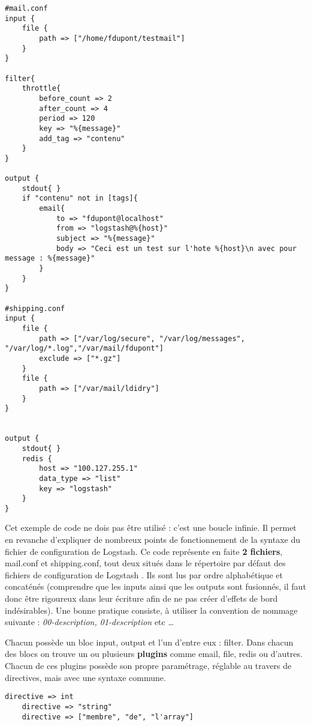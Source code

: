 \begin{lstlisting}[style=logstash,label={lst:conflogstashiniteloop},caption={Infinite loop}]
#mail.conf
input {
    file {
        path => ["/home/fdupont/testmail"]
    }
}

filter{
    throttle{
        before_count => 2
        after_count => 4
        period => 120
        key => "%{message}"
        add_tag => "contenu"
    }
}

output {
    stdout{ }
    if "contenu" not in [tags]{
        email{
            to => "fdupont@localhost"
            from => "logstash@%{host}"
            subject => "%{message}"
            body => "Ceci est un test sur l'hote %{host}\n avec pour message : %{message}"
        }
    }
}

#shipping.conf
input {
    file {
        path => ["/var/log/secure", "/var/log/messages", "/var/log/*.log","/var/mail/fdupont"]
        exclude => ["*.gz"]
    }
    file {
        path => ["/var/mail/ldidry"]
    }
}


output {
    stdout{ }
    redis {
        host => "100.127.255.1"
        data_type => "list"
        key => "logstash"
    }
}
\end{lstlisting}

Cet exemple de code ne dois pas être utilisé : c'est une boucle infinie.
Il permet en revanche d'expliquer de nombreux points de fonctionnement de la syntaxe
du fichier de configuration de Logstash.
Ce code représente en faite {\bfseries 2 fichiers}, mail.conf et shipping.conf, tout
deux situés dans le répertoire par défaut des fichiers de configuration de Logstash
. Ils sont lus par ordre alphabétique et concaténés 
(comprendre que les inputs ainsi que les outputs sont fusionnés, il faut donc être
rigoureux dans leur écriture afin de ne pas créer d'effets de bord indésirables).
Une bonne pratique consiste, à utiliser la convention de nommage suivante : \textit{
00-description, 01-description} etc \ldots


Chacun possède un bloc input, output et l'un d'entre eux : filter.
Dans chacun des blocs on trouve un ou plusieurs {\bfseries plugins} comme email, 
file, redis ou d'autres. 
Chacun de ces plugins possède son propre paramétrage, réglable au travers de 
directives, mais avec une syntaxe commune.


\begin{lstlisting}[style=logstash,label={lst:conflogstashsyntaxe1},caption={Syntaxe}]
    directive => int
    directive => "string"
    directive => ["membre", "de", "l'array"]
\end{lstlisting}

